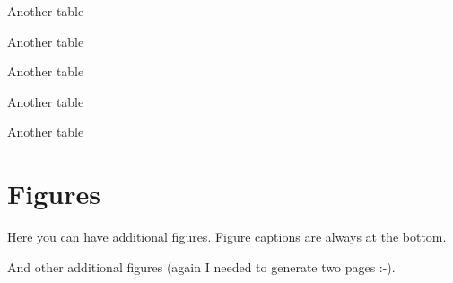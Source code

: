 \documentclass[msc,oneside]{ubcthesis}%
\begin{document}
\begin{table}
\caption{Another table}
\end{table}
\begin{table}
\caption{Another table}
\end{table}
\begin{table}
\caption{Another table}
\end{table}
\begin{table}
\caption{Another table}
\end{table}
\begin{table}
\caption{Another table}
\end{table}

\chapter{Figures}
Here you can have additional figures. Figure captions are always at the bottom.

\newpage

And other additional figures (again I needed to generate two pages :-).
\end{document}
